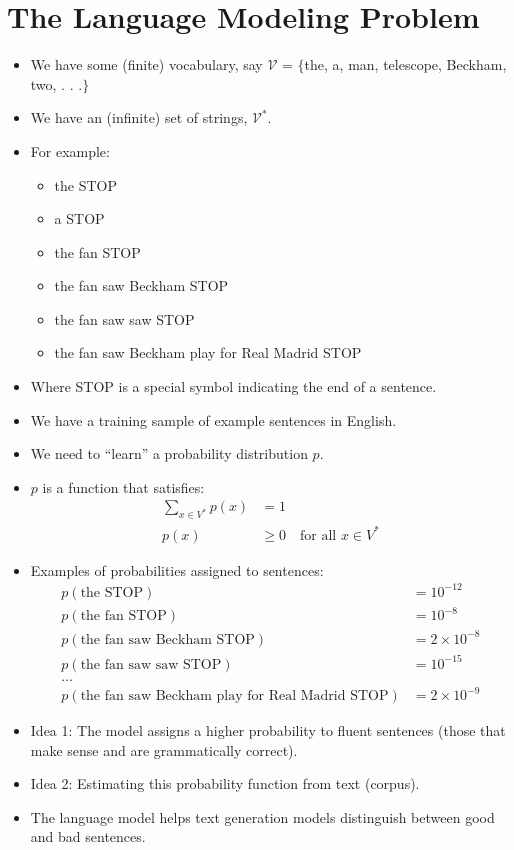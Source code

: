 \documentclass{book}
\begin{document}
\section{The Language Modeling Problem}

\begin{itemize}
\item We have some (finite) vocabulary, say $\mathcal{V}$ = $\{$the, a, man, telescope, Beckham, two, . . .$\}$
\item We have an (infinite) set of strings, $\mathcal{V}^*$.
\item For example: 
\begin{itemize}
 \item the STOP 
\item a STOP 
\item the fan STOP
\item the fan saw Beckham STOP
\item the fan saw saw STOP
\item the fan saw Beckham play for Real Madrid STOP
\end{itemize}
\item Where STOP is a special symbol indicating the end of a sentence.
\item We have a training sample of example sentences in English.
\item We need to ``learn'' a probability distribution $p$.
\item $p$ is a function that satisfies:
\begin{align*}
\sum_{x\in V^*} p(x) &= 1 \\
p(x) &\geq 0 \quad \text{for all } x \in V^*
\end{align*}


\item Examples of probabilities assigned to sentences:
\begin{align*}
p(\text{the STOP}) &= 10^{-12} \\
p(\text{the fan STOP}) &= 10^{-8} \\
p(\text{the fan saw Beckham STOP}) &= 2 \times 10^{-8} \\
p(\text{the fan saw saw STOP}) &= 10^{-15} \\
\ldots \\
p(\text{the fan saw Beckham play for Real Madrid STOP}) &= 2 \times 10^{-9}
\end{align*}
\item Idea 1: The model assigns a higher probability to fluent sentences (those that make sense and are grammatically correct).
\item Idea 2: Estimating this probability function from text (corpus).
\item The language model helps text generation models distinguish between good and bad sentences.
\end{itemize}
\end{document}
